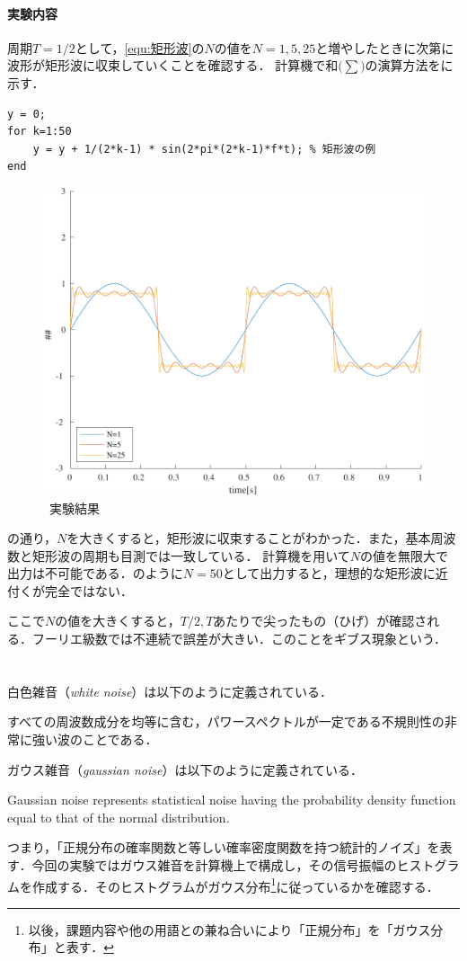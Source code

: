 \paragraph{実験内容}周期\(T=1/2\)として，\eqref{equ:矩形波}の\(N\)の値を\(N=1, 5, 25\)と増やしたときに次第に波形が矩形波に収束していくことを確認する．
計算機で和\(\big(\sum\big)\)の演算方法をに示す．
\begin{lstlisting}[caption={和の演算},label={src:和の演算},numbers={none}]
y = 0;
for k=1:50
    y = y + 1/(2*k-1) * sin(2*pi*(2*k-1)*f*t); % 矩形波の例
end
\end{lstlisting}
\result
\begin{figure}
    \centering
    \includegraphics[keepaspectratio,width=.3\textwidth]{../../Figures/01_04_2.pdf}
    \caption{\kadaiad\ 実験結果}
    \label{fig:\kadaiae_実験結果}
    \vspace{-1cm}
\end{figure}
の通り，\(N\)を大きくすると，矩形波に収束することがわかった．また，基本周波数と矩形波の周期も目測では一致している．
\consideration
計算機を用いて\(N\)の値を無限大で出力は不可能である．のように\(N=50\)として出力すると，理想的な矩形波に近付くが完全ではない．\par
ここで\(N\)の値を大きくすると，\(T/2, T\)あたりで尖ったもの（ひげ）が確認される．フーリエ級数では不連続で誤差が大きい．このことをギブス現象という．\cite[p.34]{信号処理}
\section{\kadaiae}\label{sec:\kadaiae}
\purpose
白色雑音（\textit{white noise}）は以下のように定義されている．
\begin{leftbar}
    すべての周波数成分を均等に含む，パワースペクトルが一定である不規則性の非常に強い波のことである．
    \hfill\cite{witenoise}
\end{leftbar}
ガウス雑音（\textit{gaussian noise}）は以下のように定義されている．
\begin{leftbar}
    Gaussian noise represents statistical noise having the probability density function equal to that of the normal distribution.
    \hfill\cite{barbu2013variational}
\end{leftbar}
つまり，「正規分布の確率関数と等しい確率密度関数を持つ統計的ノイズ」を表す．今回の実験ではガウス雑音を計算機上で構成し，その信号振幅のヒストグラムを作成する．そのヒストグラムがガウス分布\footnote{以後，課題内容や他の用語との兼ね合いにより「正規分布」を「ガウス分布」と表す．}に従っているかを確認する．

